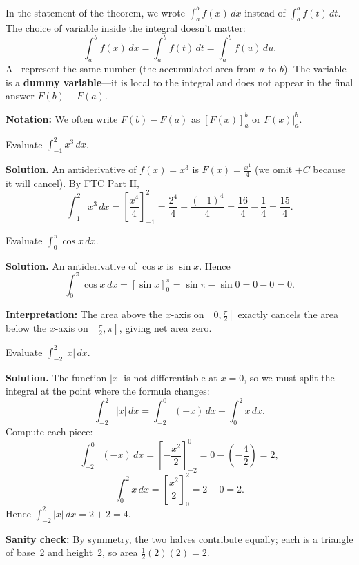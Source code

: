 In the statement of the theorem, we wrote $\int_a^b f(x)\,dx$ instead of $\int_a^b f(t)\,dt$. The choice of variable inside the integral doesn't matter:
\[
\int_a^b f(x)\,dx = \int_a^b f(t)\,dt = \int_a^b f(u)\,du.
\]
All represent the same number (the accumulated area from $a$ to $b$). The variable is a \textbf{dummy variable}---it is local to the integral and does not appear in the final answer $F(b)-F(a)$.

\vspace{0.5em}

\textbf{Notation:} We often write $F(b)-F(a)$ as $\left[F(x)\right]_a^b$ or $F(x)\Big|_a^b$.

\begin{examplebox}[title={Worked Example: FTC Part II (direct evaluation)}]
Evaluate $\displaystyle \int_{-1}^{2} x^3\,dx$.

\textbf{Solution.}
An antiderivative of $f(x)=x^3$ is $F(x)=\frac{x^4}{4}$ (we omit $+C$ because it will cancel). By FTC Part II,
\[
\int_{-1}^{2} x^3\,dx = \left[\frac{x^4}{4}\right]_{-1}^{2} = \frac{2^4}{4}-\frac{(-1)^4}{4}=\frac{16}{4}-\frac{1}{4}=\frac{15}{4}.
\]
\end{examplebox}

\begin{examplebox}[title={Worked Example: FTC Part II with endpoint checks}]
Evaluate $\displaystyle \int_0^\pi \cos x\,dx$.

\textbf{Solution.}
An antiderivative of $\cos x$ is $\sin x$. Hence
\[
\int_0^\pi \cos x\,dx = \left[\sin x\right]_0^\pi = \sin\pi - \sin 0 = 0-0=0.
\]

\textbf{Interpretation:} The area above the $x$-axis on $[0,\tfrac{\pi}{2}]$ exactly cancels the area below the $x$-axis on $[\tfrac{\pi}{2},\pi]$, giving net area zero.
\end{examplebox}

\begin{examplebox}[title={Worked Example: FTC Part II with absolute value (sign change)}]
Evaluate $\displaystyle \int_{-2}^2 |x|\,dx$.

\textbf{Solution.}
The function $|x|$ is not differentiable at $x=0$, so we must split the integral at the point where the formula changes:
\[
\int_{-2}^2 |x|\,dx = \int_{-2}^0 (-x)\,dx + \int_0^2 x\,dx.
\]
Compute each piece:
\[
\int_{-2}^0 (-x)\,dx = \left[-\frac{x^2}{2}\right]_{-2}^0 = 0-\left(-\frac{4}{2}\right)=2,
\]
\[
\int_0^2 x\,dx = \left[\frac{x^2}{2}\right]_0^2 = 2-0=2.
\]
Hence $\displaystyle \int_{-2}^2 |x|\,dx = 2+2=4$.

\textbf{Sanity check:} By symmetry, the two halves contribute equally; each is a triangle of base~2 and height~2, so area $\tfrac{1}{2}(2)(2)=2$.
\end{examplebox}

